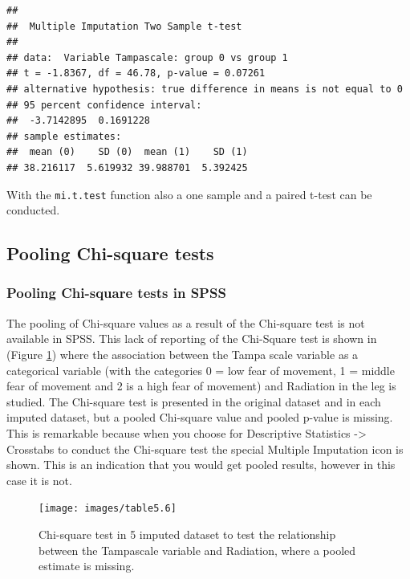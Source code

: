 \documentclass[
]{book}
\begin{document}
\begin{verbatim}
## 
##  Multiple Imputation Two Sample t-test
## 
## data:  Variable Tampascale: group 0 vs group 1
## t = -1.8367, df = 46.78, p-value = 0.07261
## alternative hypothesis: true difference in means is not equal to 0
## 95 percent confidence interval:
##  -3.7142895  0.1691228
## sample estimates:
##  mean (0)    SD (0)  mean (1)    SD (1) 
## 38.216117  5.619932 39.988701  5.392425
\end{verbatim}

With the \texttt{mi.t.test} function also a one sample and a paired t-test can be conducted.

\hypertarget{pooling-chi-square-tests}{%
\subsection{Pooling Chi-square tests}\label{pooling-chi-square-tests}}

\hypertarget{pooling-chi-square-tests-in-spss}{%
\subsubsection{Pooling Chi-square tests in SPSS}\label{pooling-chi-square-tests-in-spss}}

The pooling of Chi-square values as a result of the Chi-square test is not available in SPSS. This lack of reporting of the Chi-Square test is shown in (Figure \ref{fig:tab5-6}) where the association between the Tampa scale variable as a categorical variable (with the categories 0 = low fear of movement, 1 = middle fear of movement and 2 is a high fear of movement) and Radiation in the leg is studied. The Chi-square test is presented in the original dataset and in each imputed dataset, but a pooled Chi-square value and pooled p-value is missing. This is remarkable because when you choose for Descriptive Statistics -\textgreater{} Crosstabs to conduct the Chi-square test the special Multiple Imputation icon is shown. This is an indication that you would get pooled results, however in this case it is not.

\begin{figure}

{\centering \texttt{[image: images/table5.6]} 

}

\caption{Chi-square test in 5 imputed dataset to test the relationship between the Tampascale variable and Radiation, where a pooled estimate is missing.}\label{fig:tab5-6}
\end{figure}
\end{document}
